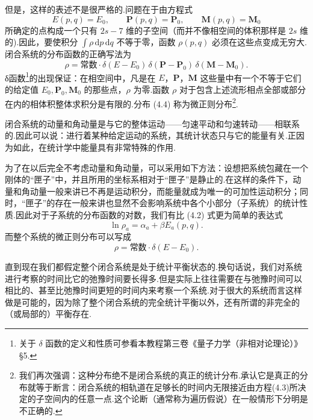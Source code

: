 但是，这样的表述不是很严格的.问题在于由方程式
\begin{equation}
  E(p,q)=E_0,\qquad
  \boldsymbol{P}(p,q)=\boldsymbol{P}_0,\qquad
  \boldsymbol{M}(p,q)=\boldsymbol{M}_0
\end{equation}
所确定的点构成一个只有 $2s-7$ 维的子空间（而并不像相空间的体积那样是 $2s$ 维的).因此，要使积分 $\int\rho\,\mathrm{d}p\,\mathrm{d}q$ 不等于零，函数 $\rho(p,q)$ 必须在这些点变成无穷大.闭合系统的分布函数的正确写法为
\begin{equation}
  \rho=\text{常数}\cdot\delta(E-E_0)\,
  \delta(\boldsymbol{P}-\boldsymbol{P}_0)\,
  \delta(\boldsymbol{M}-\boldsymbol{M}_0).
\end{equation}
δ函数\footnote{关于 $\delta$ 函数的定义和性质可参看本教程第三卷《量子力学（非相对论理论）》§5.}的出现保证：在相空间中，凡是在 $E$，$\boldsymbol{P}$，$\boldsymbol{M}$ 这些量中有一个不等于它们的给定值 $E_0,\boldsymbol{P}_0,\boldsymbol{M}_0$ 的那些点，$\rho$ 为零.函数 $\rho$ 对于包含上述流形相点全部或部分在内的相体积整体求积分是有限的.分布 (4.4) 称为微正则分布\footnote{我们再次强调：这种分布绝不是闭合系统的真正的统计分布.承认它是真正的分布就等于断言：闭合系统的相轨道在足够长的时间内无限接近由方程(4.3)所决定的子空间内的任意一点.这个论断（通常称为遍历假说）在一般情形下分明是不正确的.}.

闭合系统的动量和角动量是与它的整体运动——匀速平动和匀速转动——相联系的.因此可以说：进行着某种给定运动的系统，其统计状态只与它的能量有关.正因为如此，在统计学中能量具有非常特殊的作用.

为了在以后完全不考虑动量和角动量，可以采用如下方法：设想把系统包藏在一个刚体的“匣子”中，并且所用的坐标系相对于“匣子”是静止的.在这样的条件下，动量和角动量一般来讲已不再是运动积分，而能量就成为唯一的可加性运动积分；同时，“匣子”的存在一般来讲也显然不会影响系统中各个小部分（子系统）的统计性质.因此对于子系统的分布函数的对数，我们有比 (4.2) 式更为简单的表达式
\begin{equation}
  \ln\rho_a=\alpha_a+\beta E_a(p,q).
\end{equation}
而整个系统的微正则分布可以写成
\begin{equation}
  \rho=\text{常数}\cdot\delta(E-E_0).
\end{equation}

直到现在我们都假定整个闭合系统是处于统计平衡状态的.换句话说，我们对系统进行考察的时间比它的弛豫时间要长得多.但是实际上往往需要在与弛豫时间可以相比的、甚至比弛豫时间更短的时间内来考察一个系统.对于很大的系统而言这样做是可能的，因为除了整个闭合系统的完全统计平衡以外，还有所谓的非完全的（或局部的）平衡存在.

